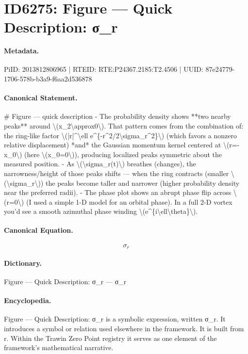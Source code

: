 \section*{ID6275: Figure — Quick Description: σ\_r}
\paragraph{Metadata.}
PiID: 2013812806965 | RTEID: RTE:P24367.2185:T2.4506 | UUID: 87e24779-1706-578b-b3a9-f6aa2d536878

\paragraph{Canonical Statement.}
\# Figure — quick description - The probability density shows **two nearby peaks** around \textbackslash{}(x\_2\textbackslash{}approx0\textbackslash{}). That pattern comes from the combination of: the ring-like factor \textbackslash{}(|r|\textasciicircum{}\textbackslash{}ell e\textasciicircum{}\{-r\textasciicircum{}2/2\textbackslash{}sigma\_r\textasciicircum{}2\}\textbackslash{}) (which favors a nonzero relative displacement) *and* the Gaussian momentum kernel centered at \textbackslash{}(r=-x\_0\textbackslash{}) (here \textbackslash{}(x\_0=0\textbackslash{})), producing localized peaks symmetric about the measured position. - As \textbackslash{}(\textbackslash{}sigma\_r(t)\textbackslash{}) breathes (changes), the narrowness/height of those peaks shifts — when the ring contracts (smaller \textbackslash{}(\textbackslash{}sigma\_r\textbackslash{})) the peaks become taller and narrower (higher probability density near the preferred radii). - The phase plot shows an abrupt phase flip across \textbackslash{}(r=0\textbackslash{}) (I used a simple 1-D model for an orbital phase). In a full 2-D vortex you’d see a smooth azimuthal phase winding \textbackslash{}(e\textasciicircum{}\{i\textbackslash{}ell\textbackslash{}theta\}\textbackslash{}).

\paragraph{Canonical Equation.}
\[
\sigma_r
\]

\paragraph{Dictionary.}
Figure — Quick Description: σ\_r — σ\_r

\paragraph{Encyclopedia.}
Figure — Quick Description: σ\_r is a symbolic expression, written σ\_r. It introduces a symbol or relation used elsewhere in the framework. It is built from r. Within the Trawin Zero Point registry it serves as one element of the framework's mathematical narrative.

